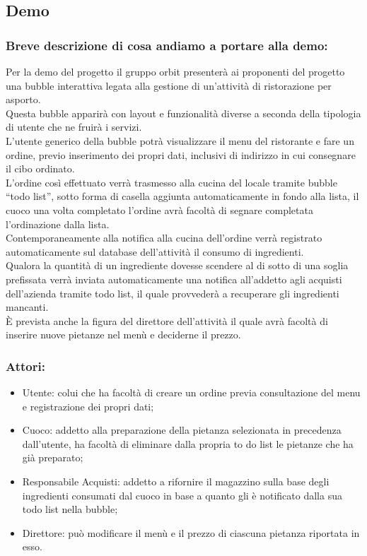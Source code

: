 \subsection{Demo}

\subsubsection{Breve descrizione di cosa andiamo a portare alla demo:}
Per la demo del progetto il gruppo orbit presenterà ai proponenti del progetto una bubble interattiva legata alla gestione di un'attività di ristorazione per asporto.
\\Questa bubble apparirà con layout e funzionalità diverse a seconda della tipologia di utente che ne fruirà i servizi.
\\L’utente generico della bubble potrà visualizzare il menu del ristorante e fare un ordine, previo inserimento dei propri dati, inclusivi di indirizzo in cui consegnare il cibo ordinato.
\\L'ordine così effettuato verrà trasmesso alla cucina del locale tramite bubble “todo list”, sotto forma di casella aggiunta automaticamente in fondo alla lista, il cuoco una volta completato l'ordine avrà facoltà di segnare completata l’ordinazione dalla lista.
\\Contemporaneamente alla notifica alla cucina dell’ordine verrà registrato automaticamente sul database dell’attività il consumo di ingredienti.
\\Qualora la quantità di un ingrediente dovesse scendere al di sotto di una soglia prefissata verrà inviata automaticamente una notifica all’addetto agli acquisti dell’azienda tramite todo list, il quale provvederà a recuperare gli ingredienti mancanti.
\\È prevista anche la figura del direttore dell'attività il quale avrà facoltà di inserire nuove pietanze nel menù e deciderne il prezzo.

\subsubsection{Attori:}
\begin{itemize}
	\item Utente: colui che ha facoltà di creare un ordine previa consultazione del menu e registrazione dei propri dati;
	\item Cuoco: addetto alla preparazione della pietanza selezionata in precedenza dall’utente, ha facoltà di eliminare dalla propria to do list le pietanze che ha già preparato;
	\item Responsabile Acquisti: addetto a rifornire il magazzino sulla base degli ingredienti consumati dal cuoco in base a quanto gli è notificato dalla sua todo list nella bubble;
	\item Direttore: può modificare il menù e il prezzo di ciascuna pietanza riportata in esso.
\end{itemize}

